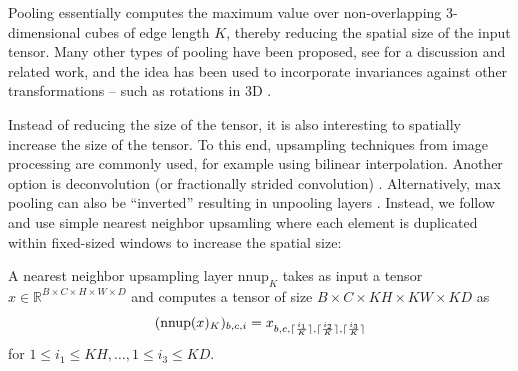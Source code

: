 Pooling essentially computes the maximum value over non-overlapping $3$-dimensional cubes of
edge length $K$, thereby reducing the spatial size of the input tensor.
Many other types of pooling
have been proposed, see \cite{BoureauLeCun:2010} for a discussion and
related work, and the idea has been used to incorporate invariances against
other transformations -- such as rotations in 3D \cite{QiGuibas:2016,HedgeZadeh:2016}.

Instead of reducing the size of the tensor, it is also interesting to spatially
increase the size of the tensor. To this end, upsampling techniques from
image processing are commonly used, for example using bilinear interpolation.
Another option is deconvolution (or fractionally strided convolution)
\cite{ZeilerFergus:2010,DumoulinVisin:2016}. Alternatively, max pooling can also
be ``inverted'' resulting in unpooling layers \cite{ZeilerFergus:2014}.
Instead, we follow \cite{OdenaDumoulinOlah:2016} and use simple nearest
neighbor upsamling where each element is duplicated within fixed-sized
windows to increase the spatial size:

\begin{definition}
  A nearest neighbor upsampling layer $\text{nnup}_{K}$ takes as input a
  tensor $x \in \mathbb{R}^{B \times C \times H \times W \times D}$ and computes a tensor
  of size $B \times C \times KH \times KW \times KD$ as
  \begin{align}
    (\text{nnup}(x)_{K})_{b, c, i} = x_{b, c, \lceil\frac{i_1}{K}\rceil, \lceil\frac{i_2}{K}\rceil, \lceil\frac{i_3}{K}\rceil}
  \end{align}
  for $1 \leq i_1 \leq KH, \ldots, 1 \leq i_3 \leq KD$.
\end{definition}

